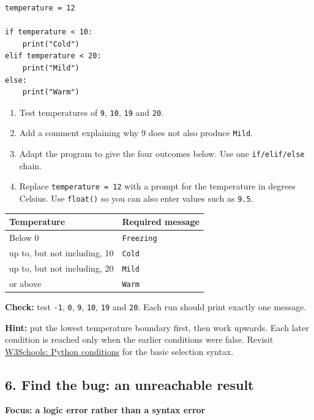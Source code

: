 \documentclass[12pt,a4paper]{article}
\begin{document}
\begin{minipage}{\linewidth}
\begin{lstlisting}
temperature = 12

if temperature < 10:
    print("Cold")
elif temperature < 20:
    print("Mild")
else:
    print("Warm")
\end{lstlisting}
\end{minipage}
\par
\begin{enumerate}
\item Test temperatures of \texttt{9}, \texttt{10}, \texttt{19} and \texttt{20}.
\item Add a comment explaining why 9 does not also produce \texttt{Mild}.
\item Adapt the program to give the four outcomes below. Use one \texttt{if/elif/else} chain.
\item Replace \texttt{temperature = 12} with a prompt for the temperature in degrees Celsius. Use \texttt{float()} so you can also enter values such as \texttt{9.5}.
\end{enumerate}
\begingroup\small\renewcommand{\arraystretch}{1.3}\begin{longtable}{>{\raggedright\arraybackslash}p{}>{\raggedright\arraybackslash}p{}}
\toprule
\rowcolor{panel} Temperature & Required message \\ \midrule\endhead
Below 0 & \texttt{Freezing} \\
0 up to, but not including, 10 & \texttt{Cold} \\
10 up to, but not including, 20 & \texttt{Mild} \\
20 or above & \texttt{Warm} \\
\bottomrule\end{longtable}\endgroup
\textbf{Check:} test \texttt{-1}, \texttt{0}, \texttt{9}, \texttt{10}, \texttt{19} and \texttt{20}. Each run should print exactly one message.

\textbf{Hint:} put the lowest temperature boundary first, then work upwards. Each later condition is reached only when the earlier conditions were false. Revisit \href{https://www.w3schools.com/python/python_conditions.asp}{W3Schools: Python conditions} for the basic selection syntax.

\subsection*{6. Find the bug: an unreachable result}
\textbf{Focus: a logic error rather than a syntax error}
\end{document}
